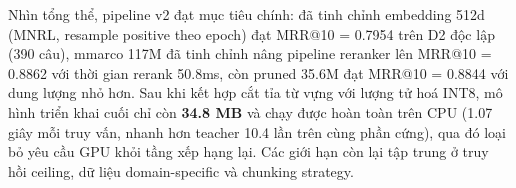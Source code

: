 \documentclass[../DoAn.tex]{subfiles}
\begin{document}
Nhìn tổng thể, pipeline v2 đạt mục tiêu chính: đã tinh chỉnh embedding 512d (MNRL, resample positive theo epoch) đạt MRR@10 = 0.7954 trên D2 độc lập (390 câu), mmarco 117M đã tinh chỉnh nâng pipeline reranker lên MRR@10 = 0.8862 với thời gian rerank 50.8ms, còn pruned 35.6M đạt MRR@10 = 0.8844 với dung lượng nhỏ hơn. Sau khi kết hợp cắt tỉa từ vựng với lượng tử hoá INT8, mô hình triển khai cuối chỉ còn \textbf{34.8 MB} và chạy được hoàn toàn trên CPU (1.07 giây mỗi truy vấn, nhanh hơn teacher 10.4 lần trên cùng phần cứng), qua đó loại bỏ yêu cầu GPU khỏi tầng xếp hạng lại. Các giới hạn còn lại tập trung ở truy hồi ceiling, dữ liệu domain-specific và chunking strategy.
\end{document}
